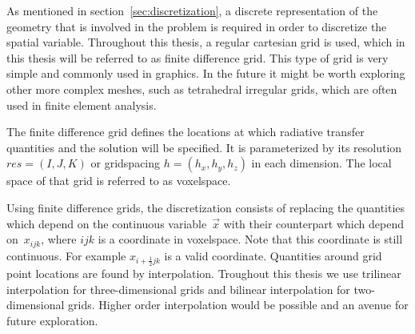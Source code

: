 As mentioned in section~\ref{sec:discretization}, a discrete representation of the geometry that is involved in the problem is required in order to discretize the spatial variable. Throughout this thesis, a regular cartesian grid is used, which in this thesis will be referred to as finite difference grid. This type of grid is very simple and commonly used in graphics. In the future it might be worth exploring other more complex meshes, such as tetrahedral irregular grids, which are often used in finite element analysis. 

The finite difference grid defines the locations at which radiative transfer quantities and the solution will be specified. It is parameterized by its resolution $res=(I,J,K)$ or gridspacing $h=(h_x, h_y, h_z)$ in each dimension. The local space of that grid is referred to as voxelspace.

Using finite difference grids, the discretization consists of replacing the quantities which depend on the continuous variable~$\vec{x}$ with their counterpart which depend on~$x_{ijk}$, where $ijk$ is a coordinate in voxelspace. Note that this coordinate is still continuous. For example $x_{i+\frac{1}{2}jk}$ is a valid coordinate. Quantities around grid point locations are found by interpolation. Troughout this thesis we use trilinear interpolation for three-dimensional grids and bilinear interpolation for two-dimensional grids. Higher order interpolation would be possible and an avenue for future exploration.

